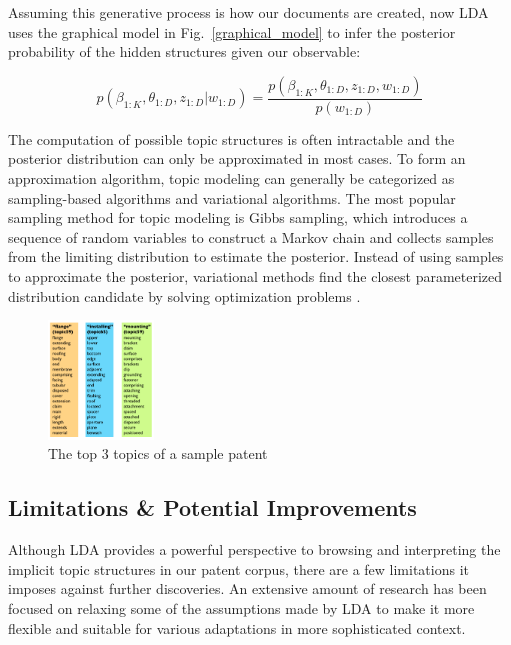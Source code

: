 \documentclass[conference]{IEEEtran}
\begin{document}
Assuming this generative process is how our documents are created, now LDA uses the graphical model in Fig.~\ref{graphical_model} to infer the posterior probability of the hidden structures given our observable:

\begin{equation*}
p(\beta_{1:K}, \theta_{1:D}, z_{1:D} | w_{1:D}) = \frac{p(\beta_{1:K}, \theta_{1:D}, z_{1:D}, w_{1:D})}{p(w_{1:D})}
\end{equation*}

The computation of possible topic structures is often intractable and the posterior distribution can only be approximated in most cases. To form an approximation algorithm, topic modeling can generally be categorized as sampling-based algorithms and variational algorithms. The most popular sampling method for topic modeling is Gibbs sampling, which introduces a sequence of random variables to construct a Markov chain and collects samples from the limiting distribution to estimate the posterior. Instead of using samples to approximate the posterior, variational methods find the closest parameterized distribution candidate by solving optimization problems \cite{lda2003} \cite{bach2010}.

\begin{figure}[h]
	\center
	\includegraphics[width=0.25\textwidth]{fig/topics.png}
	\caption{The top 3 topics of a sample patent}
	\label{top3topics}
\end{figure}





\subsection{Limitations \& Potential Improvements}
Although LDA provides a powerful perspective to browsing and interpreting the implicit topic structures in our patent corpus, there are a few limitations it imposes against further discoveries. An extensive amount of research has been focused on relaxing some of the assumptions made by LDA to make it more flexible and suitable for various adaptations in more sophisticated context. 
\end{document}
